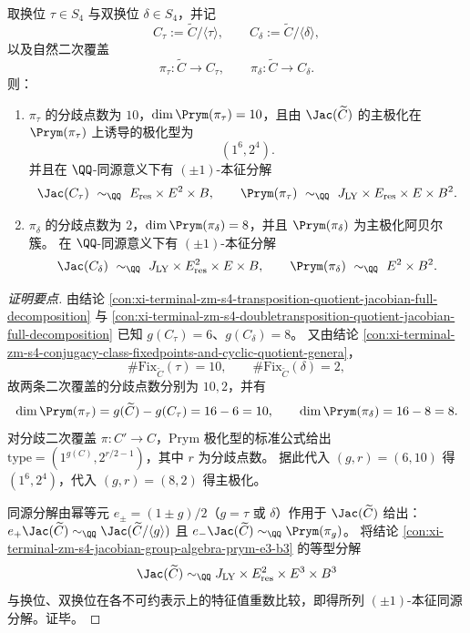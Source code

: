 \begin{conclusion}\label{con:xi-terminal-zm-s4-involution-prym-polarization-eigensplitting}
取换位 \(\tau\in S_4\) 与双换位 \(\delta\in S_4\)，并记
\[
C_{\tau}:=\widetilde{C}/\langle\tau\rangle,\qquad
C_{\delta}:=\widetilde{C}/\langle\delta\rangle,
\]
以及自然二次覆盖
\[
\pi_{\tau}:\widetilde{C}\to C_{\tau},\qquad
\pi_{\delta}:\widetilde{C}\to C_{\delta}.
\]
则：
\begin{enumerate}
  \item \(\pi_{\tau}\) 的分歧点数为 \(10\)，\(\dim \Prym(\pi_{\tau})=10\)，且由 \(\Jac(\widetilde{C})\) 的主极化在 \(\Prym(\pi_{\tau})\) 上诱导的极化型为
  \[
  (1^{6},2^{4}).
  \]
  并且在 \(\QQ\)-同源意义下有 \((\pm1)\)-本征分解
  \[
  \Jac(C_{\tau})\ \sim_{\QQ}\ E_{\mathrm{res}}\times E^2\times B,\qquad
  \Prym(\pi_{\tau})\ \sim_{\QQ}\ J_{\mathrm{LY}}\times E_{\mathrm{res}}\times E\times B^2.
  \]
  \item \(\pi_{\delta}\) 的分歧点数为 \(2\)，\(\dim \Prym(\pi_{\delta})=8\)，并且 \(\Prym(\pi_{\delta})\) 为主极化阿贝尔簇。
  在 \(\QQ\)-同源意义下有 \((\pm1)\)-本征分解
  \[
  \Jac(C_{\delta})\ \sim_{\QQ}\ J_{\mathrm{LY}}\times E_{\mathrm{res}}^2\times E\times B,\qquad
  \Prym(\pi_{\delta})\ \sim_{\QQ}\ E^2\times B^2.
  \]
\end{enumerate}
\end{conclusion}
\begin{proof}[证明要点]
由结论 \ref{con:xi-terminal-zm-s4-transposition-quotient-jacobian-full-decomposition} 与
\ref{con:xi-terminal-zm-s4-doubletransposition-quotient-jacobian-full-decomposition} 已知 \(g(C_{\tau})=6\)、\(g(C_{\delta})=8\)。
又由结论 \ref{con:xi-terminal-zm-s4-conjugacy-class-fixedpoints-and-cyclic-quotient-genera}，
\[
\#\mathrm{Fix}_{\widetilde C}(\tau)=10,\qquad \#\mathrm{Fix}_{\widetilde C}(\delta)=2,
\]
故两条二次覆盖的分歧点数分别为 \(10,2\)，并有
\[
\dim\Prym(\pi_{\tau})=g(\widetilde C)-g(C_{\tau})=16-6=10,\qquad
\dim\Prym(\pi_{\delta})=16-8=8.
\]
对分歧二次覆盖 \(\pi:C'\to C\)，Prym 极化型的标准公式给出
\(\mathrm{type}=(1^{g(C)},2^{r/2-1})\)，其中 \(r\) 为分歧点数。
据此代入 \((g,r)=(6,10)\) 得 \((1^6,2^4)\)，代入 \((g,r)=(8,2)\) 得主极化。
\par
同源分解由幂等元 \(e_{\pm}=(1\pm g)/2\)（\(g=\tau\) 或 \(\delta\)）作用于 \(\Jac(\widetilde C)\) 给出：
\(
e_+\Jac(\widetilde C)\sim_{\QQ}\Jac(\widetilde C/\langle g\rangle)
\)
且
\(
e_-\Jac(\widetilde C)\sim_{\QQ}\Prym(\pi_g)
\)。
将结论 \ref{con:xi-terminal-zm-s4-jacobian-group-algebra-prym-e3-b3} 的等型分解
\[
\Jac(\widetilde C)\sim_{\QQ}J_{\mathrm{LY}}\times E_{\mathrm{res}}^2\times E^3\times B^3
\]
与换位、双换位在各不可约表示上的特征值重数比较，即得所列 \((\pm1)\)-本征同源分解。证毕。
\end{proof}

